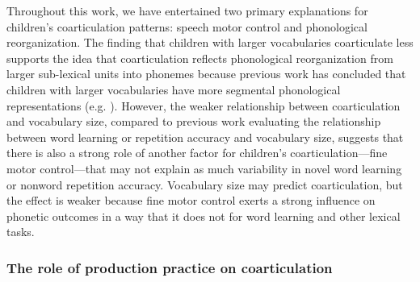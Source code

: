 \documentclass[a4paper,man,natbib,donotrepeattitle, apacite]{apa6}
\begin{document}
Throughout this work, we have entertained two primary explanations for children’s coarticulation patterns: speech motor control and phonological reorganization. The finding that children with larger vocabularies coarticulate less supports the idea that coarticulation reflects phonological reorganization from larger sub-lexical units into phonemes because previous work has concluded that children with larger vocabularies have more segmental phonological representations (e.g. ). However, the weaker relationship between coarticulation and vocabulary size, compared to previous work evaluating the relationship between word learning or repetition accuracy and vocabulary size, suggests that there is also a strong role of another factor for children’s coarticulation---fine motor control---that may not explain as much variability in novel word learning or nonword repetition accuracy. Vocabulary size may predict coarticulation, but the effect is weaker because fine motor control exerts a strong influence on phonetic outcomes \cite{barbierWhatAnticipatoryCoarticulation2020} in a way that it does not for word learning and other lexical tasks.

\subsubsection{The role of production practice on coarticulation}
\end{document}
